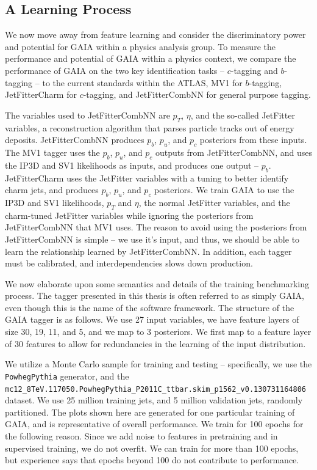 \subsection{A Learning Process}

We now move away from feature learning and consider the discriminatory power and potential for GAIA within a physics analysis group. To measure the performance and potential of GAIA within a physics context, we compare the performance of GAIA on the two key identification tasks -- $c$-tagging and $b$-tagging -- to the current standards within the ATLAS, MV1 for $b$-tagging, JetFitterCharm for $c$-tagging, and JetFitterCombNN for general purpose tagging.

The variables used to JetFitterCombNN are $p_T$, $\eta$, and the so-called JetFitter variables, a reconstruction algorithm that parses particle tracks out of energy deposits. JetFitterCombNN produces $p_b$, $p_u$, and $p_c$ posteriors from these inputs. The MV1 tagger uses the $p_b$, $p_u$, and $p_c$ outputs from JetFitterCombNN, and uses the IP3D and SV1 likelihoods as inputs, and produces one output -- $p_b$. JetFitterCharm uses the JetFitter variables with a tuning to better identify charm jets, and produces $p_b$, $p_u$, and $p_c$ posteriors. We train GAIA to use the IP3D and SV1 likelihoods, $p_T$ and $\eta$, the normal JetFitter variables, and the charm-tuned JetFitter variables while ignoring the posteriors from JetFitterCombNN that MV1 uses. The reason to avoid using the posteriors from JetFitterCombNN is simple -- we use it's input, and thus, we should be able to learn the relationship learned by JetFitterCombNN. In addition, each tagger must be calibrated, and interdependencies slows down production.  

We now elaborate upon some semantics and details of the training benchmarking process. The tagger presented in this thesis is often referred to as simply GAIA, even though this is the name of the software framework. The structure of the GAIA tagger is as follows. We use 27 input variables, we have feature layers of size 30, 19, 11, and 5, and we map to 3 posteriors. We first map to a feature layer of 30 features to allow for redundancies in the learning of the input distribution. 

We utilize a Monte Carlo sample for training and testing -- specifically, we use the \texttt{PowhegPythia} generator, and the \texttt{mc12\_8TeV.117050.PowhegPythia\_P2011C\_ttbar.skim\_p1562\_v0.130731164806} dataset. We use 25 million training jets, and 5 million validation jets, randomly partitioned. The plots shown here are generated for one particular training of GAIA, and is representative of overall performance. We train for  100 epochs for the following reason. Since we add noise to features in pretraining and in supervised training, we do not overfit. We can train for more than 100 epochs, but experience says that epochs beyond 100 do not contribute to performance.

